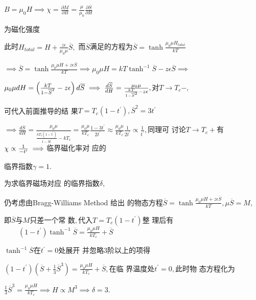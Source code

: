 \documentclass{ctexart}
\begin{document}
$B=\mu _{0}H\implies \chi =\frac{\partial M}{\partial B}=\frac{\mu }{\mu _{0}%
}\frac{\partial \overline{S}}{\partial H}$

为磁化强度

此时$H_{total}=H+\frac{z\epsilon }{\mu _{0}\mu }\overline{S},$%
而$\overline{S}$满足的方程为$%
\overline{S}=\tanh \frac{\mu _{0}\mu H_{total}}{kT}$

$\implies \overline{S}=\tanh \frac{\mu _{0}\mu H+z\epsilon \overline{S}}{kT}%
\implies \mu _{0}\mu H=kT\tanh ^{-1}\overline{S}-z\epsilon \overline{S}%
\implies $

$\mu _{0}\mu dH=\left( \frac{kT}{1-\overline{S}^{2}}-z\epsilon \right) d%
\overline{S}\implies \frac{d\overline{S}}{dH}=\frac{\mu _{0}\mu }{\frac{kT}{%
1-\overline{S}^{2}}-z\epsilon },$对$T\rightarrow T_{c}-,$

可代入前面推导的结%
果$T=T_{c}\left( 1-t^{\prime }\right) ,\overline{S}^{2}=3t^{\prime }$

$\implies \frac{d\overline{S}}{dH}=\frac{\mu _{0}\mu }{\frac{kT_{c}\left(
1-t^{\prime }\right) }{1-3t^{\prime }}-kT_{c}}=\frac{\mu _{0}\mu }{kT_{c}}%
\frac{1-3t^{\prime }}{2t^{\prime }}\approx \frac{\mu _{0}\mu }{kT_{c}}\frac{1%
}{2t^{\prime }}\propto \frac{1}{t^{\prime }},$同理可%
讨论$T\rightarrow T_{c}+$有$\chi \propto \frac{1}{%
-t^{\prime }}\implies $临界磁化率对%
应的

临界指数$\gamma =1.$

\bigskip 为求临界磁场对应%
的临界指数$\delta ,$

仍考虑由Bragg-Williams Method 给出%
的物态方程$\overline{S}=\tanh \frac{\mu
_{0}\mu H+z\epsilon \overline{S}}{kT},\mu \overline{S}=M,$

即$\overline{S}$与$M$只差一个常%
数$,$代入$T=T_{c}\left( 1-t^{\prime }\right) $整%
理后有$\qquad \left( 1-t^{\prime }\right) \tanh ^{-1}%
\overline{S}=\frac{\mu _{0}\mu H}{kT_{c}}+\overline{S}$

$\tanh ^{-1}\overline{S}$在$t^{\prime }=0$处展开%
并忽略3阶以上的项得

$\left( 1-t^{\prime }\right) \left( \overline{S}+\frac{1}{3}\overline{S}%
^{3}\right) =\frac{\mu _{0}\mu H}{kT_{c}}+\overline{S},$在临%
界温度处$t^{\prime }=0,$此时物%
态方程化为

$\frac{1}{3}\overline{S}^{3}=\frac{\mu _{0}\mu H}{kT_{c}}\implies H\propto
M^{3}\implies \delta =3.$
\end{document}
